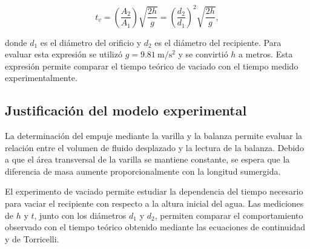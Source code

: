 \begin{equation}
    t_v=\left(\frac{A_2}{A_1}\right)\sqrt{\frac{2h}{g}}
    =\left(\frac{d_2}{d_1}\right)^2\sqrt{\frac{2h}{g}},
    \label{eq:tiempo_vaciado}
\end{equation}

donde $d_1$ es el diámetro del orificio y $d_2$ es el diámetro del recipiente. Para evaluar esta expresión se utilizó $g=\SI{9.81}{\meter\per\second\squared}$ y se convirtió $h$ a metros. Esta expresión permite comparar el tiempo teórico de vaciado con el tiempo medido experimentalmente.

\subsection{Justificación del modelo experimental}

La determinación del empuje mediante la varilla y la balanza permite evaluar la relación entre el volumen de fluido desplazado y la lectura de la balanza. Debido a que el área transversal de la varilla se mantiene constante, se espera que la diferencia de masa aumente proporcionalmente con la longitud sumergida.

El experimento de vaciado permite estudiar la dependencia del tiempo necesario para vaciar el recipiente con respecto a la altura inicial del agua. Las mediciones de $h$ y $t$, junto con los diámetros $d_1$ y $d_2$, permiten comparar el comportamiento observado con el tiempo teórico obtenido mediante las ecuaciones de continuidad y de Torricelli.

